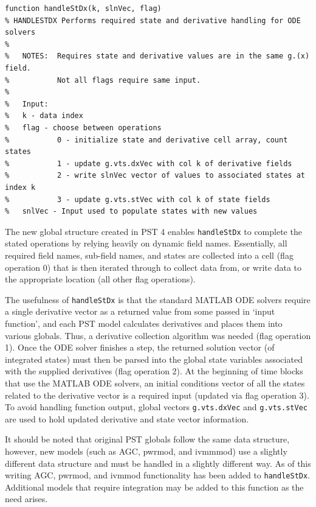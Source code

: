 \begin{lstlisting}[caption={Function Header for handleStDx},label={lst: handleStDx}]
\end{lstlisting}\vspace{-2 em}
\begin{verbatim}
function handleStDx(k, slnVec, flag)
% HANDLESTDX Performs required state and derivative handling for ODE solvers
%
%   NOTES:  Requires state and derivative values are in the same g.(x) field.
%           Not all flags require same input.
%
%   Input:
%   k - data index
%   flag - choose between operations
%           0 - initialize state and derivative cell array, count states
%           1 - update g.vts.dxVec with col k of derivative fields
%           2 - write slnVec vector of values to associated states at index k
%           3 - update g.vts.stVec with col k of state fields
%   snlVec - Input used to populate states with new values
\end{verbatim}

The new global structure created in PST 4 enables \verb|handleStDx| to complete the stated operations by relying heavily on dynamic field names. 
Essentially, all required field names, sub-field names, and states are collected into a cell (flag operation 0) that is then iterated through to collect data from, or write data to the appropriate location (all other flag operations).

The usefulness of \verb|handleStDx| is that the standard MATLAB ODE solvers require a single derivative vector as a returned value from some passed in `input function', and each PST model calculates derivatives and places them into various globals. 
Thus, a derivative collection algorithm was needed (flag operation 1).
Once the ODE solver finishes a step, the returned solution vector (of integrated states) must then be parsed into the global state variables associated with the supplied derivatives (flag operation 2).
At the beginning of time blocks that use the MATLAB ODE solvers, an initial conditions vector of all the states related to the derivative vector is a required input (updated via flag operation 3).
To avoid handling function output, global vectors \verb|g.vts.dxVec| and \verb|g.vts.stVec| are used to hold updated derivative and state vector information.

It should be noted that original PST globals follow the same data structure,
however, new models (such as AGC, pwrmod, and ivmmmod) use a slightly different data structure and must be handled in a slightly different way.
As of this writing AGC, pwrmod, and ivmmod functionality has been added to \verb|handleStDx|.
Additional models that require integration may be added to this function as the need arises.





